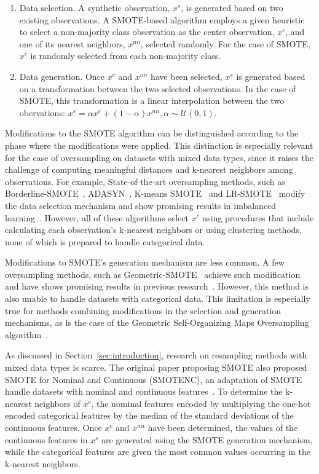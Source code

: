 \documentclass[parskip=full]{scrartcl}
\begin{document}
\begin{enumerate}
    \item Data selection. A synthetic observation, $x^s$, is generated based
        on two existing observations. A SMOTE-based algorithm employs a given
        heuristic to select a non-majority class observation as the center
        observation, $x^c$, and one of its nearest neighbors, $x^{nn}$,
        selected randomly. For the case of SMOTE, $x^c$ is randomly selected
        from each non-majority class.
    \item Data generation. Once $x^c$ and $x^{nn}$ have been selected, $x^s$
        is generated based on a transformation between the two selected
        observations. In the case of SMOTE, this transformation is 
        a linear interpolation between the two obervations: $x^s = \alpha x^c
        + (1-\alpha) x^{nn}, \alpha \sim \mathcal{U}(0, 1)$.
\end{enumerate}

Modifications to the SMOTE algorithm can be distinguished according to the
phase where the modifications were applied. This distinction is especially
relevant for the case of oversampling on datasets with mixed data types, since
it raises the challenge of computing meaningful distances and k-nearest
neighbors among observations. For example, State-of-the-art oversampling
methods, such as Borderline-SMOTE~\cite{han2005borderline},
ADASYN~\cite{he2008adasyn}, K-means SMOTE~\cite{douzas2018improving} and
LR-SMOTE~\cite{liang2020lr} modify the data selection mechanism and show
promising results in imbalanced learning~\cite{fonseca2021improving}. However,
all of these algorithms select $x^c$ using procedures that include calculating
each observation's k-nearest neighbors or using clustering methods, none of
which is prepared to handle categorical data.

Modifications to SMOTE's generation mechanism are less common. A few
oversampling methods, such as Geometric-SMOTE~\cite{douzas2019geometric}
achieve such modification and have shows promising results in previous
research~\cite{douzas2019imbalanced}. However, this method is also unable to
handle datasets with categorical data. This limitation is especially true for
methods combining modifications in the selection and generation mechanisms, as
is the case of the Geometric Self-Organizing Maps Oversampling
algorithm~\cite{douzas2021g}.

As discussed in Section~\ref{sec:introduction}, research on resampling methods
with mixed data types is scarce. The original paper proposing SMOTE also
proposed SMOTE for Nominal and Continuous (SMOTENC), an adaptation of SMOTE
handle datasets with nominal and continuous features~\cite{Chawla2002}. To
determine the k-nearest neighbors of $x^c$, the nominal features encoded by
multiplying the one-hot encoded categorical features by the median of the
standard deviations of the continuous features. Once $x^c$ and $x^{nn}$ have
been determined, the values of the continuous features in $x^s$ are generated
using the SMOTE generation mechanism, while the categorical features are given
the most common values occurring in the k-nearest neighbors.
\end{document}
